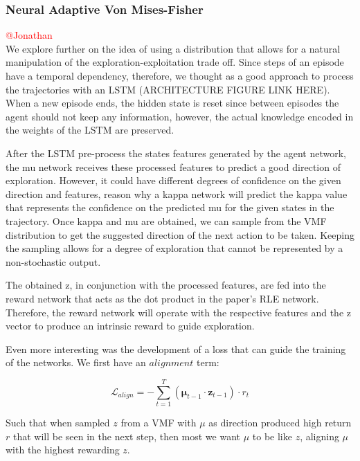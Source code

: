 \documentclass{article}  %
\begin{document}
\subsubsection{Neural Adaptive Von Mises-Fisher}
\textcolor{red}{@Jonathan}
\\
We explore further on the idea of using a distribution that allows for a natural manipulation of the exploration-exploitation trade off. 
Since steps of an episode have a temporal dependency, therefore, we thought as a good approach to process the trajectories with an LSTM (ARCHITECTURE FIGURE LINK HERE).
When a new episode ends, the hidden state is reset since between episodes the agent should not keep any information, however, the actual knowledge
encoded in the weights of the LSTM are preserved. 

After the LSTM pre-process the states features generated by the agent network, the mu network receives these processed features to predict a good direction of exploration. 
However, it could have different degrees of confidence on the given direction and features, reason why a kappa network will predict the kappa value that represents the confidence 
on the predicted mu for the given states in the trajectory. Once kappa and mu are obtained, we can sample from the VMF distribution to get the suggested direction of the next action to be taken.
Keeping the sampling allows for a degree of exploration that cannot be represented by a non-stochastic output. 

The obtained z, in conjunction with the processed features, are fed into the reward network that acts as the dot product in the paper's RLE network. Therefore, the reward network 
will operate with the respective features and the z vector to produce an intrinsic reward to guide exploration. 

Even more interesting was the development of a loss that can guide the training of the networks. We first have an $alignment$ term:

\begin{equation}
    \mathcal{L}_{align} = - \sum_{t=1}^{T} \left( \boldsymbol{\mu}_{t-1} \cdot \textbf{z}_{t-1} \right) \cdot r_{t}
\end{equation}

Such that when sampled $z$ from a VMF with $\mu$ as direction produced high return $r$ that will be seen in the next step, then 
most we want $\mu$ to be like $z$, aligning $\mu$ with the highest rewarding $z$.
\end{document}
